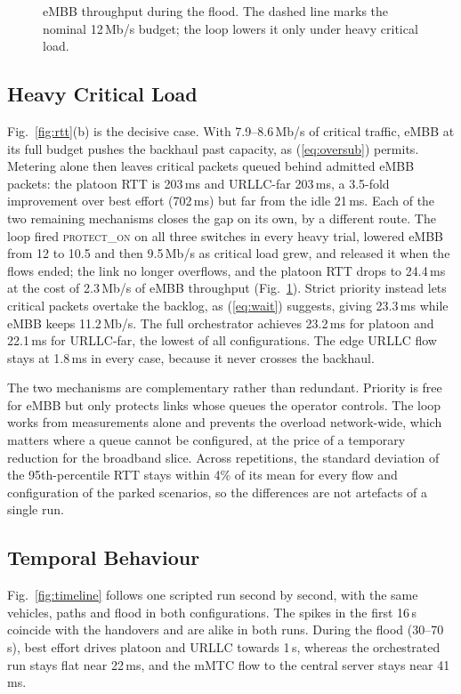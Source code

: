 \documentclass[conference]{IEEEtran}
\begin{document}
\begin{figure}[t]
\centering

\caption{eMBB throughput during the flood. The dashed line marks the nominal 12\,Mb/s budget; the loop lowers it only under heavy critical load.}
\label{fig:embb}
\end{figure}

\subsection{Heavy Critical Load}
Fig.~\ref{fig:rtt}(b) is the decisive case. With 7.9--8.6\,Mb/s of critical traffic, eMBB at its full budget pushes the backhaul past capacity, as (\ref{eq:oversub}) permits. Metering alone then leaves critical packets queued behind admitted eMBB packets: the platoon RTT is 203\,ms and URLLC-far 203\,ms, a 3.5-fold improvement over best effort (702\,ms) but far from the idle 21\,ms. Each of the two remaining mechanisms closes the gap on its own, by a different route. The loop fired \textsc{protect\_on} on all three switches in every heavy trial, lowered eMBB from 12 to 10.5 and then 9.5\,Mb/s as critical load grew, and released it when the flows ended; the link no longer overflows, and the platoon RTT drops to 24.4\,ms at the cost of 2.3\,Mb/s of eMBB throughput (Fig.~\ref{fig:embb}). Strict priority instead lets critical packets overtake the backlog, as (\ref{eq:wait}) suggests, giving 23.3\,ms while eMBB keeps 11.2\,Mb/s. The full orchestrator achieves 23.2\,ms for platoon and 22.1\,ms for URLLC-far, the lowest of all configurations. The edge URLLC flow stays at 1.8\,ms in every case, because it never crosses the backhaul.

The two mechanisms are complementary rather than redundant. Priority is free for eMBB but only protects links whose queues the operator controls. The loop works from measurements alone and prevents the overload network-wide, which matters where a queue cannot be configured, at the price of a temporary reduction for the broadband slice. Across repetitions, the standard deviation of the 95th-percentile RTT stays within 4\% of its mean for every flow and configuration of the parked scenarios, so the differences are not artefacts of a single run.

\subsection{Temporal Behaviour}
Fig.~\ref{fig:timeline} follows one scripted run second by second, with the same vehicles, paths and flood in both configurations. The spikes in the first 16\,s coincide with the handovers and are alike in both runs. During the flood (30--70\,s), best effort drives platoon and URLLC towards 1\,s, whereas the orchestrated run stays flat near 22\,ms, and the mMTC flow to the central server stays near 41\,ms.
\end{document}
